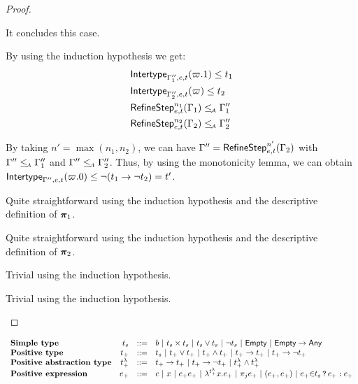 \documentclass[a4paper]{article}
\theoremstyle{definition}
\begin{document}
\begin{proof}
\begin{description}
\begin{description}
      It concludes this case.

      \item[\Rule{PAppL}] By using the induction hypothesis we get:
      \begin{align*}
        &\textsf{Intertype}_{\Gamma_1'',e,t} (\varpi.1) \leq t_1\\
        &\textsf{Intertype}_{\Gamma_2'',e,t} (\varpi) \leq t_2\\
        &\textsf{RefineStep}_{e,t}^{n_1} (\Gamma_1) \leq_{\!\scriptscriptstyle\mathcal{A}} \Gamma_1''\\
        &\textsf{RefineStep}_{e,t}^{n_2} (\Gamma_2) \leq_{\!\scriptscriptstyle\mathcal{A}} \Gamma_2''
      \end{align*}

      By taking $n'=\max (n_1,n_2)$,
      we can have $\Gamma'' = \textsf{RefineStep}_{e,t}^{n'} (\Gamma_2)$ with $\Gamma'' \leq_{\!\scriptscriptstyle\mathcal{A}} \Gamma_1''$ and $\Gamma'' \leq_{\!\scriptscriptstyle\mathcal{A}} \Gamma_2''$.
      Thus, by using the monotonicity lemma, we can obtain $\textsf{Intertype}_{\Gamma'',e,t} (\varpi.0) \leq \neg (t_1\to \neg t_2) = t'$.
  
      \item[\Rule{PPairL}] Quite straightforward using the induction hypothesis and the descriptive definition of $\boldsymbol{\pi}_1$.
      \item[\Rule{PPairR}] Quite straightforward using the induction hypothesis and the descriptive definition of $\boldsymbol{\pi}_2$.
      \item[\Rule{PFst}] Trivial using the induction hypothesis.
      \item[\Rule{PSnd}] Trivial using the induction hypothesis.
    \end{description}
  \end{description}
  \end{proof}

  \[
    \begin{array}{lrcl}
      \textbf{Simple type} & t_{s} & ::= & b ~|~ t_{s}\times t_{s} ~|~ t_{s} \vee t_{s} ~|~ \neg t_{s} ~|~ \textsf{Empty} ~|~ \textsf{Empty}\to \textsf{Any}\\
      \textbf{Positive type} & t_+ & ::= & t_{s} ~|~ t_+ \vee t_+ ~|~ t_+ \land t_+ ~|~ t_+\to t_+ ~|~ t_+\to \neg t_+\\
      \textbf{Positive abstraction type} & t^\lambda_+ & ::= & t_+\to t_+ ~|~ t_+\to \neg t_+ ~|~ t^\lambda_+ \land t^\lambda_+\\
      \textbf{Positive expression} & e_+ & ::= & c~|~ x~|~ e_+ e_+~|~\lambda^{t^\lambda_+} x.e_+~|~ \pi_j e_+~|~(e_+,e_+)~|~e_+{\in}t_{s}\,\texttt{\textup{?}}\,e_+\,\texttt{\textup{:}}\,e_+
    \end{array}
  \]
\end{document}
